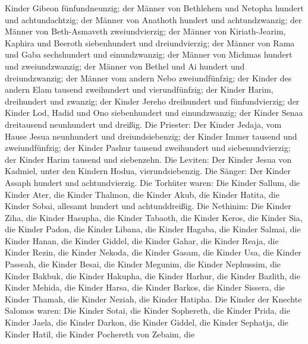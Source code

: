Kinder Gibeon fünfundneunzig;  der Männer von Bethlehem und
Netopha hundert und achtundachtzig;  der Männer von
Anathoth hundert und achtundzwanzig;  der Männer von
Beth-Asmaveth zweiundvierzig;  der Männer von
Kiriath-Jearim, Kaphira und Beeroth siebenhundert und dreiundvierzig;
 der Männer von Rama und Gaba sechshundert und
einundzwanzig;  der Männer von Michmas hundert und
zweiundzwanzig;  der Männer von Bethel und Ai hundert und
dreiundzwanzig;  der Männer vom andern Nebo zweiundfünfzig;
 der Kinder des andern Elam tausend zweihundert und
vierundfünfzig;  der Kinder Harim, dreihundert und zwanzig;
 der Kinder Jereho dreihundert und fünfundvierzig;
 der Kinder Lod, Hadid und Ono siebenhundert und
einundzwanzig;  der Kinder Senaa dreitausend neunhundert
und dreißig.  Die Priester: Der Kinder Jedaja, vom Hause
Jesua neunhundert und dreiundsiebenzig;  der Kinder Immer
tausend und zweiundfünfzig;  der Kinder Pashur tausend
zweihundert und siebenundvierzig;  der Kinder Harim tausend
und siebenzehn.  Die Leviten: Der Kinder Jesua von Kadmiel,
unter den Kindern Hodua, vierundsiebenzig.  Die Sänger: Der
Kinder Assaph hundert und achtundvierzig.  Die Torhüter
waren: Die Kinder Sallum, die Kinder Ater, die Kinder Thalmon, die
Kinder Akub, die Kinder Hatita, die Kinder Sobai, allesamt hundert und
achtunddreißig.  Die Nethinim: Die Kinder Ziha, die Kinder
Hasupha, die Kinder Tabaoth,  die Kinder Keros, die Kinder
Sia, die Kinder Padon,  die Kinder Libana, die Kinder
Hagaba, die Kinder Salmai,  die Kinder Hanan, die Kinder
Giddel, die Kinder Gahar,  die Kinder Reaja, die Kinder
Rezin, die Kinder Nekoda,  die Kinder Gasam, die Kinder
Usa, die Kinder Passeah,  die Kinder Besai, die Kinder
Megunim, die Kinder Nephussim,  die Kinder Bakbuk, die
Kinder Hakupha, die Kinder Harhur,  die Kinder Bazlith, die
Kinder Mehida, die Kinder Harsa,  die Kinder Barkos, die
Kinder Sissera, die Kinder Thamah,  die Kinder Neziah, die
Kinder Hatipha.  Die Kinder der Knechte Salomos waren: Die
Kinder Sotai, die Kinder Sophereth, die Kinder Prida,  die
Kinder Jaela, die Kinder Darkon, die Kinder Giddel,  die
Kinder Sephatja, die Kinder Hatil, die Kinder Pochereth von Zebaim, die
